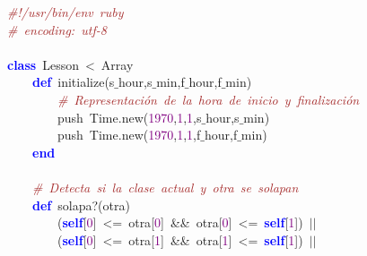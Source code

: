 \noindent
\mbox{}\textit{\textcolor{Brown}{\#!/usr/bin/env\ ruby}} \\
\mbox{}\textit{\textcolor{Brown}{\#\ encoding:\ utf-8}} \\
\mbox{} \\
\mbox{}\textbf{\textcolor{Blue}{class}}\ Lesson\ \textcolor{BrickRed}{\textless{}}\ Array \\
\mbox{}\ \ \ \ \textbf{\textcolor{Blue}{def}}\ initialize\textcolor{BrickRed}{(}s$\_$hour\textcolor{BrickRed}{,}s$\_$min\textcolor{BrickRed}{,}f$\_$hour\textcolor{BrickRed}{,}f$\_$min\textcolor{BrickRed}{)} \\
\mbox{}\ \ \ \ \ \ \ \ \textit{\textcolor{Brown}{\#\ Representación\ de\ la\ hora\ de\ inicio\ y\ finalización}} \\
\mbox{}\ \ \ \ \ \ \ \ push\ Time\textcolor{BrickRed}{.}new\textcolor{BrickRed}{(}\textcolor{Purple}{1970}\textcolor{BrickRed}{,}\textcolor{Purple}{1}\textcolor{BrickRed}{,}\textcolor{Purple}{1}\textcolor{BrickRed}{,}s$\_$hour\textcolor{BrickRed}{,}s$\_$min\textcolor{BrickRed}{)} \\
\mbox{}\ \ \ \ \ \ \ \ push\ Time\textcolor{BrickRed}{.}new\textcolor{BrickRed}{(}\textcolor{Purple}{1970}\textcolor{BrickRed}{,}\textcolor{Purple}{1}\textcolor{BrickRed}{,}\textcolor{Purple}{1}\textcolor{BrickRed}{,}f$\_$hour\textcolor{BrickRed}{,}f$\_$min\textcolor{BrickRed}{)} \\
\mbox{}\ \ \ \ \textbf{\textcolor{Blue}{end}} \\
\mbox{}\ \ \ \  \\
\mbox{}\ \ \ \ \textit{\textcolor{Brown}{\#\ Detecta\ si\ la\ clase\ actual\ y\ otra\ se\ solapan}} \\
\mbox{}\ \ \ \ \textbf{\textcolor{Blue}{def}}\ solapa?\textcolor{BrickRed}{(}otra\textcolor{BrickRed}{)} \\
\mbox{}\ \ \ \ \ \ \ \ \textcolor{BrickRed}{(}\textbf{\textcolor{Blue}{self}}\textcolor{BrickRed}{[}\textcolor{Purple}{0}\textcolor{BrickRed}{]}\ \textcolor{BrickRed}{\textless{}=}\ otra\textcolor{BrickRed}{[}\textcolor{Purple}{0}\textcolor{BrickRed}{]}\ \textcolor{BrickRed}{\&\&}\ otra\textcolor{BrickRed}{[}\textcolor{Purple}{0}\textcolor{BrickRed}{]}\ \textcolor{BrickRed}{\textless{}=}\ \textbf{\textcolor{Blue}{self}}\textcolor{BrickRed}{[}\textcolor{Purple}{1}\textcolor{BrickRed}{])}\ \textcolor{BrickRed}{$|$$|$}\  \\
\mbox{}\ \ \ \ \ \ \ \ \textcolor{BrickRed}{(}\textbf{\textcolor{Blue}{self}}\textcolor{BrickRed}{[}\textcolor{Purple}{0}\textcolor{BrickRed}{]}\ \textcolor{BrickRed}{\textless{}=}\ otra\textcolor{BrickRed}{[}\textcolor{Purple}{1}\textcolor{BrickRed}{]}\ \textcolor{BrickRed}{\&\&}\ otra\textcolor{BrickRed}{[}\textcolor{Purple}{1}\textcolor{BrickRed}{]}\ \textcolor{BrickRed}{\textless{}=}\ \textbf{\textcolor{Blue}{self}}\textcolor{BrickRed}{[}\textcolor{Purple}{1}\textcolor{BrickRed}{])}\ \textcolor{BrickRed}{$|$$|$} \\
